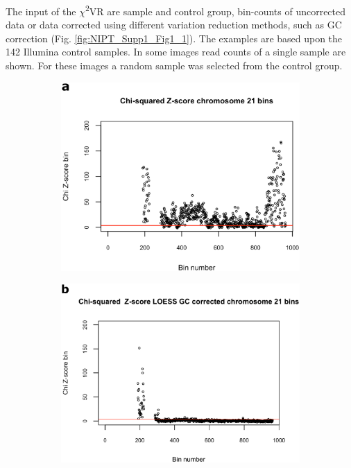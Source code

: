 \noindent The input of the $\chi$\textsuperscript{2}VR are sample and control group, bin-counts of uncorrected data or data corrected using different variation reduction methods, such as GC correction (Fig. \ref{fig:NIPT_Supp1_Fig1_1}). 
The examples are based upon the 142 Illumina control samples. 
In some images read counts of a single sample are shown. For these images a random sample was selected from the control group.

\begin{figure}[!h]
	\begin{subfigure}{.5\textwidth}
		\centering
		\includegraphics[width=1\linewidth]{img/NIPT_Supp1_Fig1_3a}
		\label{fig:NIPT_Supp1_Fig1_3a}
	\end{subfigure}%
	\begin{subfigure}{.5\textwidth}
		\centering
		\includegraphics[width=1\linewidth]{img/NIPT_Supp1_Fig1_3b}

\end{subfigure}
\end{figure}
